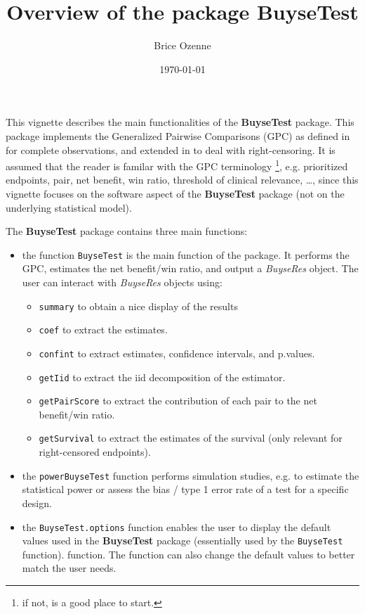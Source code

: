 \documentclass[12pt]{article}
\author{Brice Ozenne}
\date{\today}
\title{Overview of the package BuyseTest}
\begin{document}
\maketitle
This vignette describes the main functionalities of the \textbf{BuyseTest}
package. This package implements the Generalized Pairwise Comparisons
(GPC) as defined in \cite{buyse2010generalized} for complete
observations, and extended in \cite{peron2018extension} to deal with
right-censoring. It is assumed that the reader is familar with the GPC
terminology \footnote{if not, \cite{buyse2010generalized} is a good place to
start.}, e.g. prioritized endpoints, pair, net benefit, win ratio,
threshold of clinical relevance, \ldots, since this vignette focuses
on the software aspect of the \textbf{BuyseTest} package (not on the
underlying statistical model).

\bigskip

The \textbf{BuyseTest} package contains three main functions:
\begin{itemize}
\item the function \texttt{BuyseTest} is the main function of the package. It
performs the GPC, estimates the net benefit/win ratio, and output a
\emph{BuyseRes} object. The user can interact with \emph{BuyseRes} objects using:
\begin{itemize}
\item \texttt{summary} to obtain a nice display of the results
\item \texttt{coef} to extract the estimates.
\item \texttt{confint} to extract estimates, confidence intervals, and p.values.
\item \texttt{getIid} to extract the iid decomposition of the estimator.
\item \texttt{getPairScore} to extract the contribution of each pair to the net benefit/win ratio.
\item \texttt{getSurvival} to extract the estimates of the survival (only relevant for right-censored endpoints).
\end{itemize}
\item the \texttt{powerBuyseTest} function performs simulation studies,
e.g. to estimate the statistical power or assess the bias / type 1
error rate of a test for a specific design.
\item the \texttt{BuyseTest.options} function enables the user to display the
default values used in the \textbf{BuyseTest} package (essentially used by
the \texttt{BuyseTest} function). function. The function can also change
the default values to better match the user needs.
\end{itemize}
\end{document}
